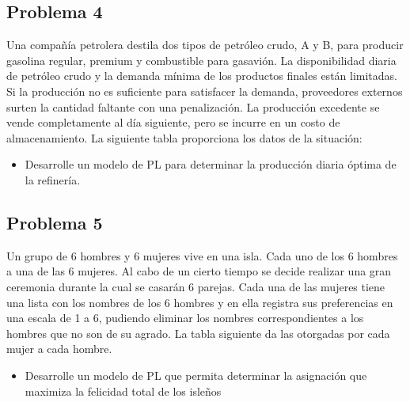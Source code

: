 \documentclass[letterpaper]{article}
\begin{document}
\subsection*{Problema 4}
Una compañía petrolera destila dos tipos de petróleo crudo, A y B, para producir gasolina regular, premium y combustible para gasavión. La disponibilidad diaria de petróleo crudo y la demanda mínima de los productos finales están limitadas. Si la producción no es suficiente para satisfacer la demanda, proveedores externos surten la cantidad faltante con una penalización. La producción excedente se vende completamente al día siguiente, pero se incurre en un costo de almacenamiento. La siguiente tabla proporciona los datos de la situación:

\begin{itemize}
\item Desarrolle un modelo de PL para determinar la producción diaria óptima de la refinería.
\end{itemize}

\subsection*{Problema 5}
Un grupo de 6 hombres y 6 mujeres vive en una isla. Cada uno de los 6 hombres  a una de las 6 mujeres. Al cabo de un cierto tiempo se decide realizar una gran ceremonia durante la cual se casarán 6 parejas. Cada una de las mujeres tiene una lista con los nombres de los 6 hombres y en ella registra sus preferencias en una escala de 1 a 6, pudiendo eliminar los nombres correspondientes a los hombres que no son de su agrado. La tabla siguiente da las  otorgadas por cada mujer a cada hombre.

\begin{itemize}
\item Desarrolle un modelo de PL que permita determinar la asignación que maximiza la felicidad total de los isleños
\end{itemize}
\end{document}
